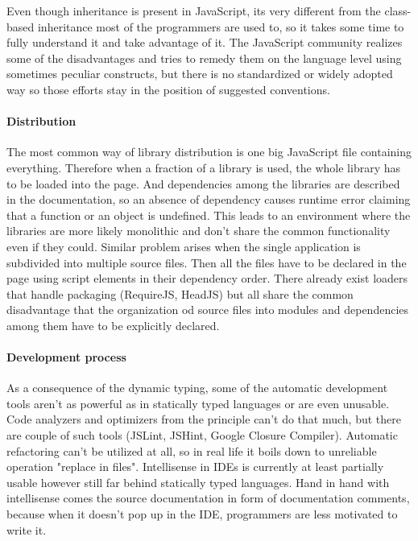 \documentclass[12pt,a4paper]{report}
\begin{document}
Even though inheritance is present in JavaScript, its very different from the class-based inheritance most of the programmers are used to, so it takes some time to fully understand it and take advantage of it. The JavaScript community realizes some of the disadvantages and tries to remedy them on the language level using sometimes peculiar constructs, but there is no standardized or widely adopted way so those efforts stay in the position of suggested conventions.

\paragraph{Distribution} The most common way of library distribution is one big JavaScript file containing everything. Therefore when a fraction of a library is used, the whole library has to be loaded into the page. And dependencies among the libraries are described in the documentation, so an absence of dependency causes runtime error claiming that a function or an object is undefined. This leads to an environment where the libraries are more likely monolithic and don't share the common functionality even if they could. Similar problem arises when the single application is subdivided into multiple source files. Then all the files have to be declared in the page using script elements in their dependency order. There already exist loaders that handle packaging (RequireJS, HeadJS) but all share the common disadvantage that the organization od source files into modules and dependencies among them have to be explicitly declared.

\paragraph{Development process} As a consequence of the dynamic typing, some of the automatic development tools aren't as powerful as in statically typed languages or are even unusable. Code analyzers and optimizers from the principle can't do that much, but there are couple of such tools (JSLint, JSHint, Google Closure Compiler). Automatic refactoring can't be utilized at all, so in real life it boils down to unreliable operation "replace in files". Intellisense in IDEs is currently at least partially usable however still far behind statically typed languages. Hand in hand with intellisense comes the source documentation in form of documentation comments, because when it doesn't pop up in the IDE, programmers are less motivated to write it.
\end{document}
